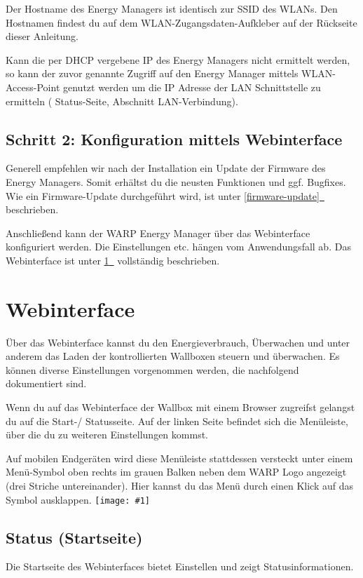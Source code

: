 \documentclass[a4paper,10pt]{article}
\newcommand{\gfx}[1]{\texttt{[image: \#1]}}
\newcommand*{\fullref}[1]{\hyperref[{#1}]{\ref*{#1}~\nameref*{#1}}}
\begin{document}
\begin{multicols*}{2}
	Der Hostname des Energy Managers ist identisch zur SSID des WLANs. Den Hostnamen findest du
	auf dem WLAN-Zugangsdaten-Aufkleber auf der Rückseite dieser Anleitung.

	Kann die per DHCP vergebene IP des Energy Managers nicht ermittelt werden, so kann der
	zuvor genannte Zugriff auf den Energy Manager mittels WLAN-Access-Point genutzt
	werden um die IP Adresse der LAN Schnittstelle zu ermitteln (\glqq
	Status-Seite\grqq, Abschnitt \glqq LAN-Verbindung\grqq).


	\subsection{Schritt 2: Konfiguration mittels Webinterface}
	Generell empfehlen wir nach der Installation ein Update der Firmware des
	Energy Managers. Somit erhältst du die neusten Funktionen und ggf. Bugfixes. Wie ein
	Firmware-Update durchgeführt wird, ist unter \fullref{firmware-update}
	beschrieben.

	Anschließend kann der WARP Energy Manager über das Webinterface konfiguriert
	werden. Die Einstellungen etc. hängen vom Anwendungsfall ab. 
	Das Webinterface ist unter \fullref{webinterface} vollständig beschrieben.

	\newpage
	\section{Webinterface}
	\label{webinterface}

	Über das Webinterface kannst du den Energieverbrauch, Überwachen und 
	unter anderem das Laden der kontrollierten Wallboxen steuern und überwachen.
	Es können diverse Einstellungen vorgenommen werden, die nachfolgend
	dokumentiert sind.

	Wenn du auf das Webinterface der Wallbox mit einem Browser zugreifst
	gelangst du auf die Start-/ Statusseite. Auf der linken Seite befindet sich
	die Menüleiste, über die du zu weiteren Einstellungen kommst.

	Auf mobilen Endgeräten wird
	diese Menüleiste stattdessen versteckt unter einem Menü-Symbol oben rechts
	im grauen Balken neben dem WARP Logo angezeigt (\glqq drei Striche untereinander\grqq).
	Hier kannst du das Menü durch einen Klick auf das Symbol ausklappen.
	\gfx{./img/resized/web_status}

	\subsection{Status (Startseite)}
	\label{status}
	Die Startseite des Webinterfaces bietet Einstellen und zeigt Statusinformationen.


\end{multicols*}
\end{document}
